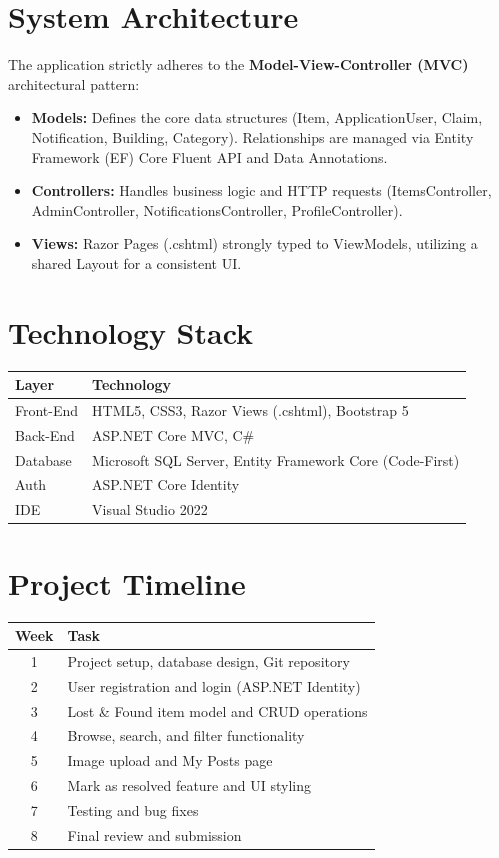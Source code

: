 \documentclass[12pt,a4paper]{report}
\begin{document}
\section{System Architecture}
The application strictly adheres to the \textbf{Model-View-Controller (MVC)} architectural pattern:
\begin{itemize}
    \item \textbf{Models:} Defines the core data structures (Item, ApplicationUser, Claim, Notification, Building, Category). Relationships are managed via Entity Framework (EF) Core Fluent API and Data Annotations.
    \item \textbf{Controllers:} Handles business logic and HTTP requests (ItemsController, AdminController, NotificationsController, ProfileController).
    \item \textbf{Views:} Razor Pages (.cshtml) strongly typed to ViewModels, utilizing a shared Layout for a consistent UI.
\end{itemize}

\section{Technology Stack}
\begin{table}[H]
\centering
\begin{tabular}{|l|l|}
\hline
\textbf{Layer} & \textbf{Technology} \\ \hline
Front-End & HTML5, CSS3, Razor Views (.cshtml), Bootstrap 5 \\ \hline
Back-End & ASP.NET Core MVC, C\# \\ \hline
Database & Microsoft SQL Server, Entity Framework Core (Code-First) \\ \hline
Auth & ASP.NET Core Identity \\ \hline
IDE & Visual Studio 2022 \\ \hline
\end{tabular}
\end{table}

\section{Project Timeline}
\begin{table}[H]
\centering
\begin{tabular}{|c|l|}
\hline
\textbf{Week} & \textbf{Task} \\ \hline
1 & Project setup, database design, Git repository \\ \hline
2 & User registration and login (ASP.NET Identity) \\ \hline
3 & Lost \& Found item model and CRUD operations \\ \hline
4 & Browse, search, and filter functionality \\ \hline
5 & Image upload and My Posts page \\ \hline
6 & Mark as resolved feature and UI styling \\ \hline
7 & Testing and bug fixes \\ \hline
8 & Final review and submission \\ \hline
\end{tabular}
\end{table}
\end{document}
